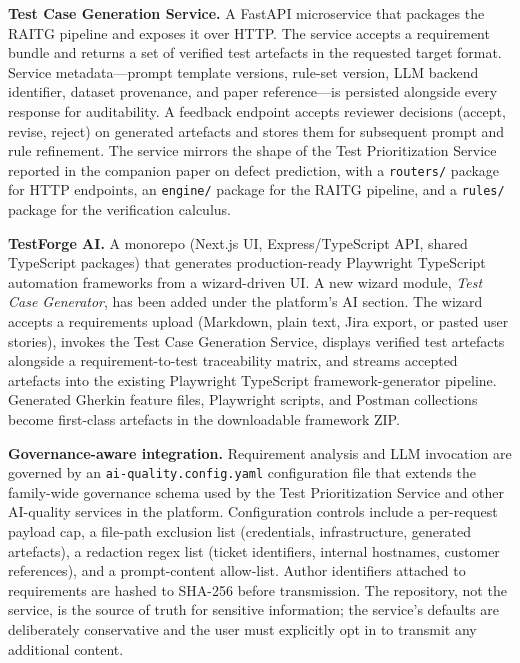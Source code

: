 \documentclass[conference]{IEEEtran}
\begin{document}
\textbf{Test Case Generation Service.} A FastAPI microservice that packages the RAITG pipeline and exposes it over HTTP. The service accepts a requirement bundle and returns a set of verified test artefacts in the requested target format. Service metadata---prompt template versions, rule-set version, LLM backend identifier, dataset provenance, and paper reference---is persisted alongside every response for auditability. A feedback endpoint accepts reviewer decisions (accept, revise, reject) on generated artefacts and stores them for subsequent prompt and rule refinement. The service mirrors the shape of the Test Prioritization Service reported in the companion paper on defect prediction, with a \texttt{routers/} package for HTTP endpoints, an \texttt{engine/} package for the RAITG pipeline, and a \texttt{rules/} package for the verification calculus.

\textbf{TestForge AI.} A monorepo (Next.js UI, Express/TypeScript API, shared TypeScript packages) that generates production-ready Playwright TypeScript automation frameworks from a wizard-driven UI. A new wizard module, \emph{Test Case Generator}, has been added under the platform's AI section. The wizard accepts a requirements upload (Markdown, plain text, Jira export, or pasted user stories), invokes the Test Case Generation Service, displays verified test artefacts alongside a requirement-to-test traceability matrix, and streams accepted artefacts into the existing Playwright TypeScript framework-generator pipeline. Generated Gherkin feature files, Playwright scripts, and Postman collections become first-class artefacts in the downloadable framework ZIP.

\textbf{Governance-aware integration.} Requirement analysis and LLM invocation are governed by an \texttt{ai-quality.config.yaml} configuration file that extends the family-wide governance schema used by the Test Prioritization Service and other AI-quality services in the platform. Configuration controls include a per-request payload cap, a file-path exclusion list (credentials, infrastructure, generated artefacts), a redaction regex list (ticket identifiers, internal hostnames, customer references), and a prompt-content allow-list. Author identifiers attached to requirements are hashed to SHA-256 before transmission. The repository, not the service, is the source of truth for sensitive information; the service's defaults are deliberately conservative and the user must explicitly opt in to transmit any additional content.
\end{document}
